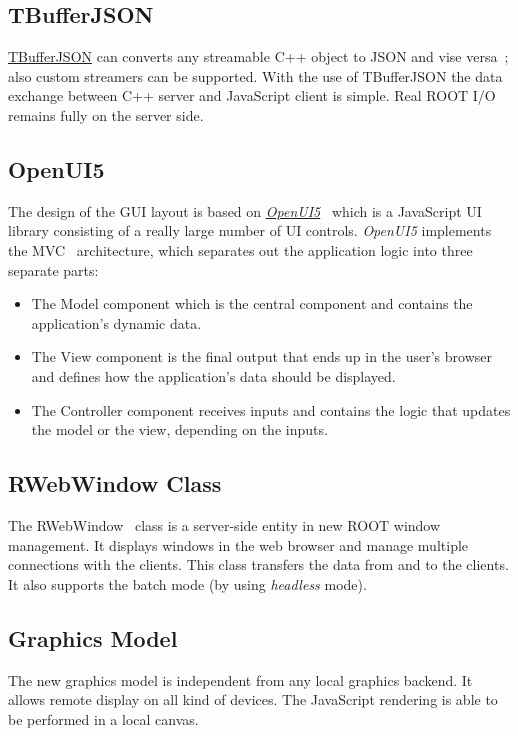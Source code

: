 \documentclass[a4paper]{jpconf}
\begin{document}
\subsection{TBufferJSON}

\href{https://root.cern.ch/doc/master/classTBufferJSON.html}{TBufferJSON} can converts
any streamable C++ object to JSON and vise versa~\cite{buffer}; also custom streamers
can be supported. With the use of TBufferJSON the data exchange between C++ server
and JavaScript client is simple. Real ROOT I/O remains fully on the server side.

\subsection{OpenUI5}
The design of the GUI layout is based on \textit{\href{https://openui5.hana.ondemand.com/}{OpenUI5}}~\cite{openui}
which is a JavaScript UI library consisting of a really large number of UI controls.
\textit{OpenUI5} implements the MVC~\cite{mvc} architecture, which separates out
the application logic into three separate parts:
\begin{itemize}
  \item The Model component which is the central component and contains the application's dynamic data.
  \item The View component is the final output that ends up in the user's browser and defines how the application's data should be displayed.
  \item The Controller component receives inputs and contains the logic that updates the model or the view, depending on the inputs.
\end{itemize}

\subsection{RWebWindow Class}
The RWebWindow~\cite{rweb} class is a server-side entity in new ROOT window management.
It displays windows in the web browser and manage multiple connections with the clients.
This class transfers the data from and to the clients. It also supports the batch
mode (by using \textit{headless} mode).

 \subsection{Graphics Model}

 The new graphics model is independent from any local graphics backend. It allows
 remote display on all kind of devices. The JavaScript rendering is able to be
 performed in a local canvas.
\end{document}

